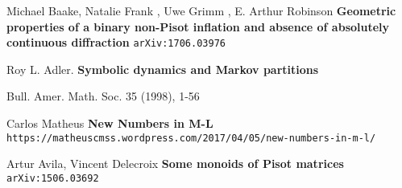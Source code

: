 \documentclass[12pt]{article}
\begin{document}
\begin{thebibliography}{}

\item Michael Baake, Natalie Frank , Uwe Grimm , E. Arthur Robinson 
\textbf{Geometric properties of a binary non-Pisot inflation and absence of absolutely continuous diffraction} \texttt{arXiv:1706.03976} 

\item Roy L. Adler.  \textbf{Symbolic dynamics and Markov partitions}

Bull. Amer. Math. Soc. 35 (1998), 1-56 

\item Carlos Matheus \textbf{New Numbers in M-L}\\ \texttt{https://matheuscmss.wordpress.com/2017/04/05/new-numbers-in-m-l/}

\item Artur Avila, Vincent Delecroix \textbf{Some monoids of Pisot matrices} \texttt{arXiv:1506.03692}

\end{thebibliography}

\newpage

\noindent 
\end{document}
